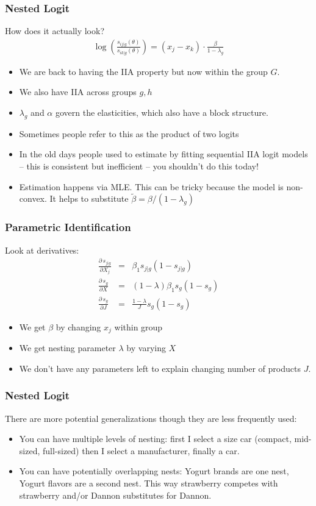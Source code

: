 \documentclass[xcolor=pdftex,dvipsnames,table,mathserif]{beamer}
\begin{document}
\begin{frame}
\frametitle{Nested Logit}
How does it actually look?
\begin{eqnarray*}
\log \left(\frac{s_{ij|g}(\theta)}{s_{ik|g}(\theta)} \right) = (x_j -x_k)\cdot \frac{\beta}{1-\lambda_g}
 \end{eqnarray*}
 \begin{itemize}
\item We are back to having the IIA property but now within the group $G$.
\item We also have IIA across groups $g,h$
\item $\lambda_g$ and $\alpha$ govern the elasticities, which also have a block structure. %
\item Sometimes people refer to this as the \alert{product of two logits}
\item In the old days people used to estimate by fitting sequential IIA logit models -- this is consistent but inefficient -- you shouldn't do this today!
\item Estimation happens via MLE. This can be tricky because the model is non-convex. It helps to substitute $\tilde{\beta} = \beta/(1-\lambda_g)$
 \end{itemize}
\end{frame}

\begin{frame}
\frametitle{Parametric Identification}

Look at derivatives:
\begin{eqnarray*}
\frac{\partial\, s_{j|g}}{\partial X_j} &=& \beta_1 s_{j|g}(1-s_{j|g}) \\
 \frac{\partial\, s_{g}}{\partial X} &=& (1-\lambda) \beta_1 s_{g}(1-s_{g}) \\
  \frac{\partial\, s_{g}}{\partial J} &=& \frac{1-\lambda}{J} s_{g}(1-s_{g})
\end{eqnarray*}
\begin{itemize}
\item We get $\beta$ by changing $x_j$ within group
\item We get nesting parameter $\lambda$ by varying $X$
\item We don't have any parameters left to explain changing number of products $J$.
\end{itemize}

\end{frame}



\begin{frame}
\frametitle{Nested Logit}
There are more potential generalizations though they are less frequently used:
 \begin{itemize}
\item You can have multiple levels of nesting: first I select a size car (compact, mid-sized, full-sized) then I select a manufacturer, finally a car.
\item You can have potentially overlapping nests: Yogurt brands are one nest, Yogurt flavors are a second nest. This way strawberry competes with strawberry and/or Dannon substitutes for Dannon.
 \end{itemize}
\end{frame}
\end{document}
